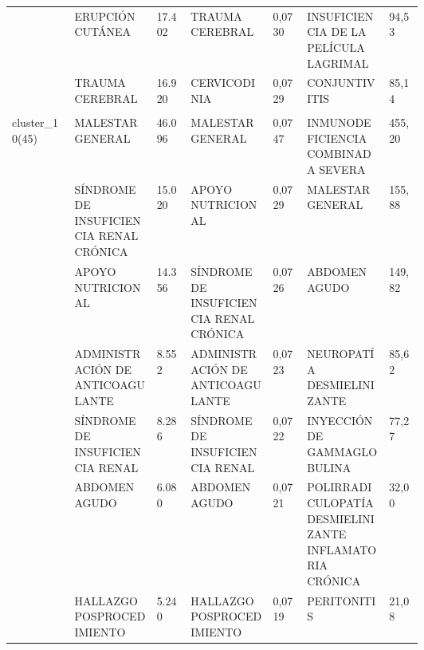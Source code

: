 \begin{landscape}
\begin{longtable}[c]{@{}lp{0.2\linewidth}lp{0.2\linewidth}lp{0.2\linewidth}l@{}}
                                  & ERUPCIÓN CUTÁNEA                                              & 17.402 & TRAUMA CEREBRAL                                        & 0,0730 & INSUFICIENCIA DE LA PELÍCULA LAGRIMAL                         & 94,53    \\
                                  & TRAUMA CEREBRAL                                               & 16.920 & CERVICODINIA                                           & 0,0729 & CONJUNTIVITIS                                                 & 85,14    \\ \\
\multirow{10}{*}{cluster\_10(45)} & MALESTAR GENERAL                                              & 46.096 & MALESTAR GENERAL                                       & 0,0747 & INMUNODEFICIENCIA COMBINADA SEVERA                            & 455,20   \\
                                  & SÍNDROME DE INSUFICIENCIA RENAL CRÓNICA                       & 15.020 & APOYO NUTRICIONAL                                      & 0,0729 & MALESTAR GENERAL                                              & 155,88   \\
                                  & APOYO NUTRICIONAL                                             & 14.356 & SÍNDROME DE INSUFICIENCIA RENAL CRÓNICA                & 0,0726 & ABDOMEN AGUDO                                                 & 149,82   \\
                                  & ADMINISTRACIÓN DE ANTICOAGULANTE                              & 8.552  & ADMINISTRACIÓN DE ANTICOAGULANTE                       & 0,0723 & NEUROPATÍA DESMIELINIZANTE                                    & 85,62    \\
                                  & SÍNDROME DE INSUFICIENCIA RENAL                               & 8.286  & SÍNDROME DE INSUFICIENCIA RENAL                        & 0,0722 & INYECCIÓN DE GAMMAGLOBULINA                                   & 77,27    \\
                                  & ABDOMEN AGUDO                                                 & 6.080  & ABDOMEN AGUDO                                          & 0,0721 & POLIRRADICULOPATÍA DESMIELINIZANTE INFLAMATORIA CRÓNICA       & 32,00    \\
                                  & HALLAZGO POSPROCEDIMIENTO                                     & 5.240  & HALLAZGO POSPROCEDIMIENTO                              & 0,0719 & PERITONITIS                                                   & 21,08    \\

\end{longtable}
\end{landscape}
